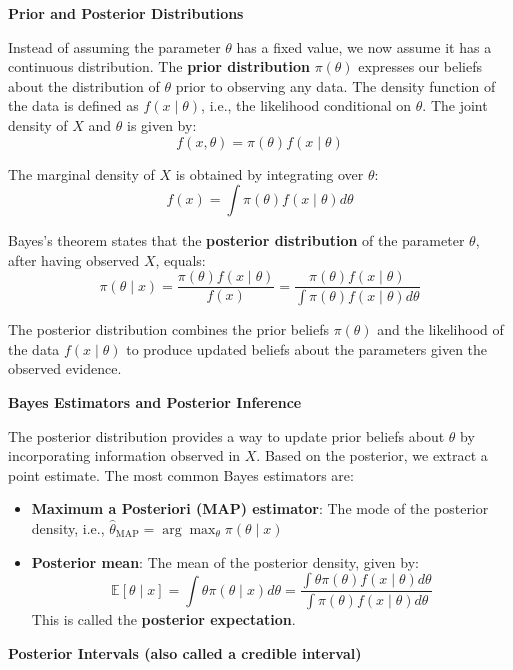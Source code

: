 \documentclass[12pt,a4paper]{article}
\begin{document}
\textbf{Prior and Posterior Distributions}

Instead of assuming the parameter $\theta$ has a fixed value, we now assume it has a continuous distribution. The \textbf{prior distribution} $\pi(\theta)$ expresses our beliefs about the distribution of $\theta$ prior to observing any data. The density function of the data is defined as $f(x \mid \theta)$, i.e., the likelihood conditional on $\theta$. The joint density of $X$ and $\theta$ is given by:
\[
f(x, \theta) = \pi(\theta) f(x \mid \theta)
\]

The marginal density of $X$ is obtained by integrating over $\theta$:
\[
f(x) = \int \pi(\theta) f(x \mid \theta) d\theta
\]

Bayes's theorem states that the \textbf{posterior distribution} of the parameter $\theta$, after having observed $X$, equals:
\[
\pi(\theta \mid x) = \frac{\pi(\theta) f(x \mid \theta)}{f(x)} = \frac{\pi(\theta) f(x \mid \theta)}{\int \pi(\theta) f(x \mid \theta) d\theta}
\]

The posterior distribution combines the prior beliefs $\pi(\theta)$ and the likelihood of the data $f(x \mid \theta)$ to produce updated beliefs about the parameters given the observed evidence.

\vspace{0.5em}

\textbf{Bayes Estimators and Posterior Inference}

The posterior distribution provides a way to update prior beliefs about $\theta$ by incorporating information observed in $X$. Based on the posterior, we extract a point estimate. The most common Bayes estimators are:

\begin{itemize}
    \item \textbf{Maximum a Posteriori (MAP) estimator}: The mode of the posterior density, i.e., $\hat{\theta}_{\text{MAP}} = \arg\max_{\theta} \pi(\theta \mid x)$
    \item \textbf{Posterior mean}: The mean of the posterior density, given by:
    \[
    \mathbb{E}[\theta \mid x] = \int \theta \pi(\theta \mid x) d\theta = \frac{\int \theta \pi(\theta) f(x \mid \theta) d\theta}{\int \pi(\theta) f(x \mid \theta) d\theta}
    \]
    This is called the \textbf{posterior expectation}.
\end{itemize}

\vspace{0.5em}

\textbf{Posterior Intervals (also called a credible interval)}
\end{document}
